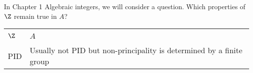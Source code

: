 In Chapter 1 Algebraic integers, we will consider a question. Which properties of $\Z$ remain true in $A$?
\begin{table}[h]
    \centering
    \begin{tabular}{|p{}|p{}|}
        \hline\\
        $\Z$ &  $A$\\
        \hline\\
        PID & Usually not PID but non-principality is determined by a finite group\\
        \hline
    \end{tabular}
    \label{tab:table1}
\end{table}
\clearpage